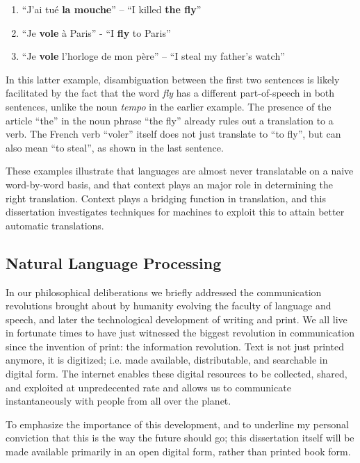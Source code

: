 \begin{enumerate}
\item ``J'ai tué \textbf{la mouche}'' -- ``I killed \textbf{the fly}''
\item ``Je \textbf{vole} à Paris'' - ``I \textbf{fly} to Paris''
\item ``Je \textbf{vole} l'horloge de mon père'' -- ``I steal my father's watch''
\end{enumerate}

In this latter example, disambiguation between the first two sentences is
likely facilitated by the fact that the word \emph{fly} has a different
part-of-speech in both sentences, unlike the noun \emph{tempo} in the earlier example.
The presence of the article ``the'' in the noun phrase ``the fly'' already
rules out a translation to a verb. The French verb ``voler'' itself does not
just translate to ``to fly'', but can also mean ``to steal'', as shown in
the last sentence. 

These examples illustrate that languages are almost never translatable on a naive
word-by-word basis, and that context plays an major role in determining the
right translation. Context plays a bridging function in translation, and this
dissertation investigates techniques for machines to exploit this to attain
better automatic translations.

\subsection{Natural Language Processing}

In our philosophical deliberations we briefly addressed the communication
revolutions brought about by humanity evolving the faculty of language and
speech, and later the technological development of writing and print. We all
live in fortunate times to have just witnessed the biggest revolution in
communication since the invention of print: the information revolution. Text is
not just printed anymore, it is digitized; i.e. made available, distributable,
and searchable in digital form. The internet enables these digital resources to
be collected, shared, and exploited at unpredecented rate and allows us to
communicate instantaneously with people from all over the planet. 

To emphasize the importance of this development, and to underline my personal
conviction that this is the way the future should go; this dissertation itself will
be made available primarily in an open digital form, rather than printed book form.

